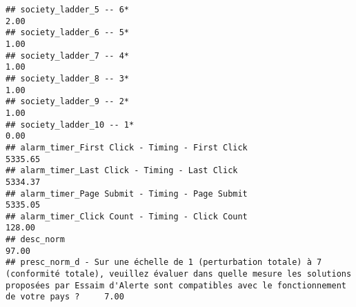 \documentclass[
]{article}
\begin{document}
\begin{verbatim}
## society_ladder_5 -- 6*                                                                                                                                                                                                         2.00
## society_ladder_6 -- 5*                                                                                                                                                                                                         1.00
## society_ladder_7 -- 4*                                                                                                                                                                                                         1.00
## society_ladder_8 -- 3*                                                                                                                                                                                                         1.00
## society_ladder_9 -- 2*                                                                                                                                                                                                         1.00
## society_ladder_10 -- 1*                                                                                                                                                                                                        0.00
## alarm_timer_First Click - Timing - First Click                                                                                                                                                                              5335.65
## alarm_timer_Last Click - Timing - Last Click                                                                                                                                                                                5334.37
## alarm_timer_Page Submit - Timing - Page Submit                                                                                                                                                                              5335.05
## alarm_timer_Click Count - Timing - Click Count                                                                                                                                                                               128.00
## desc_norm                                                                                                                                                                                                                     97.00
## presc_norm_d - Sur une échelle de 1 (perturbation totale) à 7 (conformité totale), veuillez évaluer dans quelle mesure les solutions proposées par Essaim d'Alerte sont compatibles avec le fonctionnement de votre pays ?     7.00

\end{verbatim}
\end{document}
